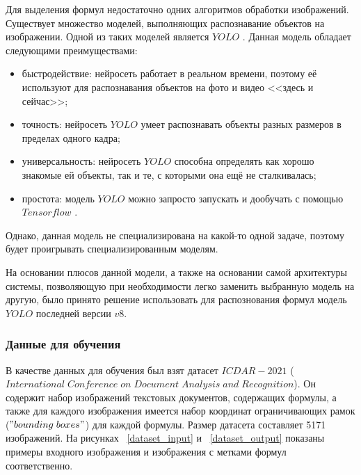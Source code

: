 Для выделения формул недостаточно одних алгоритмов обработки изображений. Существует множество моделей, выполняющих распознавание объектов на изображении.
Одной из таких моделей является $YOLO$ \cite{yolo}. Данная модель обладает следующими преимуществами:
\begin{itemize}
    \item быстродействие: нейросеть работает в реальном времени, поэтому её используют для распознавания объектов на фото и видео <<здесь и сейчас>>;
    \item точность: нейросеть $YOLO$ умеет распознавать объекты разных размеров в пределах одного кадра;
    \item универсальность: нейросеть $YOLO$ способна определять как хорошо знакомые ей объекты, так и те, с которыми она ещё не сталкивалась;
    \item простота: модель $YOLO$ можно запросто запускать и дообучать с помощью $Tensorflow$ \cite{tensorflow}.
\end{itemize}

Однако, данная модель не специализирована на какой-то одной задаче, поэтому будет проигрывать специализированным моделям.

На основании плюсов данной модели, а также на основании самой архитектуры системы, позволяющую при необходимости легко заменить выбранную модель на другую, было принято решение использовать для распознования формул модель $YOLO$ последней версии $v8$.

\subsubsection{Данные для обучения}

В качестве данных для обучения был взят датасет $ICDAR-2021$ ($International\;Conference\;on\;Document\;Analysis\;and\;Recognition$). Он содержит набор изображений текстовых документов, содержащих формулы, 
а также для каждого изображения имеется набор координат ограничивающих рамок ($"bounding\; boxes"$) для каждой формулы.
Размер датасета составляет 5171 изображений.
На рисунках ~\ref{dataset_input} и ~\ref{dataset_output} показаны примеры входного изображения и изображения с метками формул соответственно.

